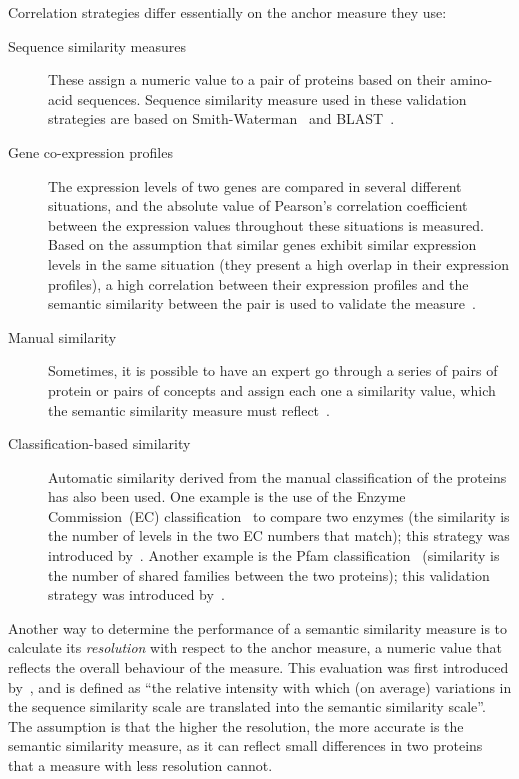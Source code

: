 Correlation strategies differ essentially on the anchor measure they use:
\begin{description}
    \item[Sequence similarity measures] These assign a numeric value to a pair of proteins based on their amino-acid sequences. Sequence similarity measure used in these validation strategies are based on Smith-Waterman~\citep{Smith1981} and BLAST~\citep{Altschul1997}.
    
    \item[Gene co-expression profiles] The expression levels of two genes are compared in several different situations, and the absolute value of Pearson's correlation coefficient between the expression values throughout these situations is measured. Based on the assumption that similar genes exhibit similar expression levels in the same situation (\ie they present a high overlap in their expression profiles), a high correlation between their expression profiles and the semantic similarity between the pair is used to validate the measure~\citep[\eg][]{Wang2004,Jain2010,Yang2012}.
    
    \item[Manual similarity] Sometimes, it is possible to have an expert go through a series of pairs of protein or pairs of  concepts and assign each one a similarity value, which the semantic similarity measure must reflect~\citep[\eg][]{Xu2013}.
    
    \item[Classification-based similarity] Automatic similarity derived from the manual classification of the proteins has also been used. One example is the use of the Enzyme Commission~(EC) classification~\citep{Moss2015} to compare two enzymes (the similarity is the number of levels in the two EC numbers that match); this strategy was introduced by~\citet{Pesquita2009a}. Another example is the Pfam classification~\citep{Bateman2002} (similarity is the number of shared families between the two proteins); this validation strategy was introduced by~\citet{Couto2007}.
\end{description}

Another way to determine the performance of a semantic similarity measure is to calculate its \emph{resolution} with respect to the anchor measure, a numeric value that reflects the overall behaviour of the measure. This evaluation was first introduced by~\citet{Pesquita2008}, and is defined as ``the relative intensity with which (on average) variations in the sequence similarity scale are translated into the semantic similarity scale''. The assumption is that the higher the resolution, the more accurate is the semantic similarity measure, as it can reflect small differences in two proteins that a measure with less resolution cannot.

